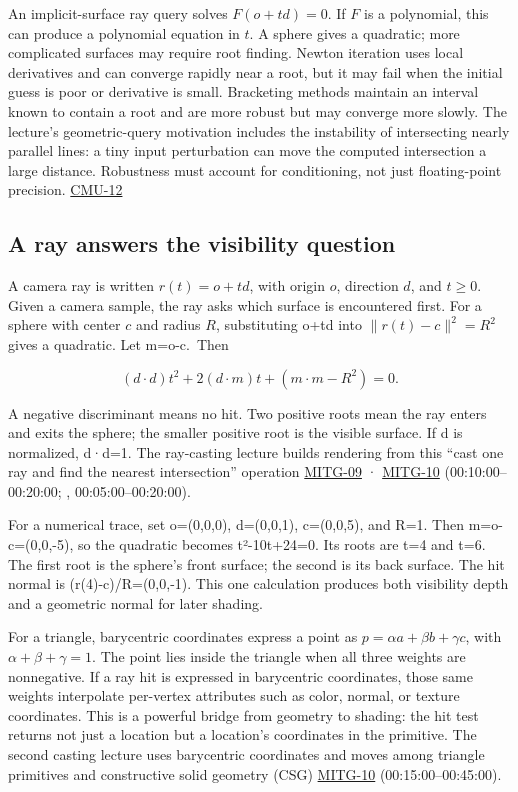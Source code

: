 An implicit-surface ray query solves \(F(o+td)=0\). If \(F\) is a polynomial, this can produce a polynomial equation in \(t\). A sphere gives a quadratic; more complicated surfaces may require root finding. Newton iteration uses local derivatives and can converge rapidly near a root, but it may fail when the initial guess is poor or derivative is small. Bracketing methods maintain an interval known to contain a root and are more robust but may converge more slowly. The lecture's geometric-query motivation includes the instability of intersecting nearly parallel lines: a tiny input perturbation can move the computed intersection a large distance. Robustness must account for conditioning, not just floating-point precision. \hyperref[04-visual-computing-ii-ch036-cmu-12---geometric-queries]{CMU-12}

\subsection{A ray answers the visibility question}\label{04-visual-computing-ii-ch028-a-ray-answers-the-visibility-question}

A camera ray is written \(r(t)=o+td\), with origin \(o\), direction \(d\), and \(t\ge0\). Given a camera sample, the ray asks which surface is encountered first. For a sphere with center \(c\) and radius \(R\), substituting o+td into \(\|r(t)-c\|^2=R^2\) gives a quadratic. Let m=o-c.~Then

\[
(d\cdot d)t^2+2(d\cdot m)t+(m\cdot m-R^2)=0.
\]

A negative discriminant means no hit. Two positive roots mean the ray enters and exits the sphere; the smaller positive root is the visible surface. If d is normalized, d·d=1. The ray-casting lecture builds rendering from this ``cast one ray and find the nearest intersection'' operation \hyperref[04-visual-computing-ii-ch036-mitg-09---ray-casting]{MITG-09} · \hyperref[04-visual-computing-ii-ch036-mitg-10---ray-casting-ii]{MITG-10} (00:10:00--00:20:00; , 00:05:00--00:20:00).

For a numerical trace, set o=(0,0,0), d=(0,0,1), c=(0,0,5), and R=1. Then m=o-c=(0,0,-5), so the quadratic becomes t²-10t+24=0. Its roots are t=4 and t=6. The first root is the sphere's front surface; the second is its back surface. The hit normal is (r(4)-c)/R=(0,0,-1). This one calculation produces both visibility depth and a geometric normal for later shading.

For a triangle, barycentric coordinates express a point as \(p=\alpha a+\beta b+\gamma c\), with \(\alpha+\beta+\gamma=1\). The point lies inside the triangle when all three weights are nonnegative. If a ray hit is expressed in barycentric coordinates, those same weights interpolate per-vertex attributes such as color, normal, or texture coordinates. This is a powerful bridge from geometry to shading: the hit test returns not just a location but a location's coordinates in the primitive. The second casting lecture uses barycentric coordinates and moves among triangle primitives and constructive solid geometry (CSG) \hyperref[04-visual-computing-ii-ch036-mitg-10---ray-casting-ii]{MITG-10} (00:15:00--00:45:00).

